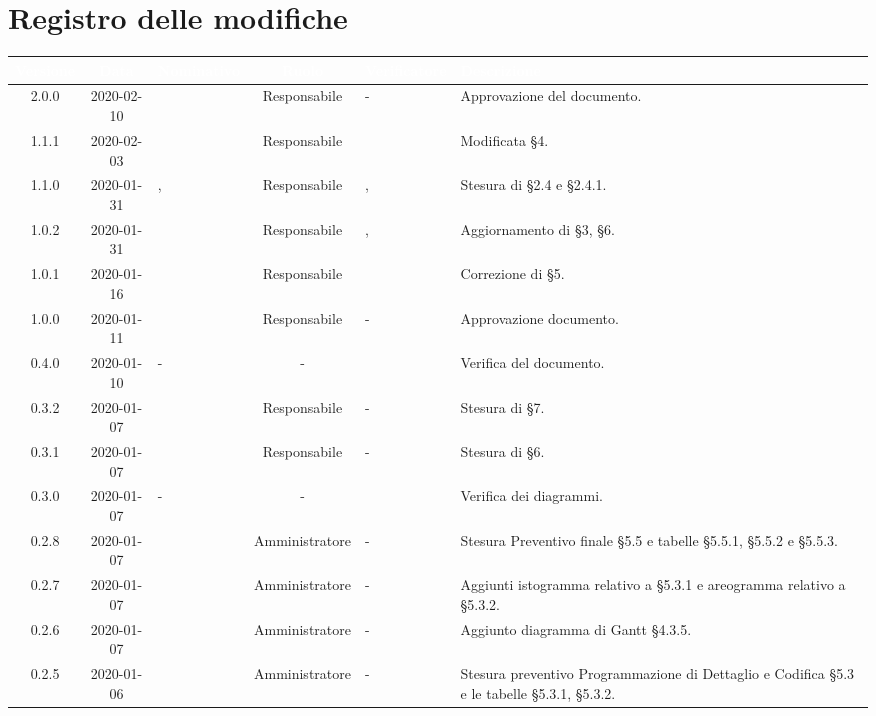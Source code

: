\section*{Registro delle modifiche}
\setcounter{table}{-1}
{
\renewcommand{\arraystretch}{1.5}
\centering
\begin{longtable}{ c c  C{2.5cm} c C{2.5cm} C{3.5cm}}
\textcolor{white}{\textbf{Versione}} &
\textcolor{white}{\textbf{Data}}&
\textcolor{white}{\textbf{Nominativo}}&
\textcolor{white}{\textbf{Ruolo}}&
\textcolor{white}{\textbf{Verificatore}}&
\textcolor{white}{\textbf{Descrizione}}\\
\endhead


2.0.0 & 2020-02-10 & \MC{} & Responsabile & - & Approvazione del documento. \\
1.1.1 & 2020-02-03 & \MC{} & Responsabile & \PF{} & Modificata §4. \\
1.1.0 & 2020-01-31 & \MC{}, \AT{} & Responsabile & \PF{}, \newline \SE{} & Stesura di §2.4 e §2.4.1. \\
1.0.2 & 2020-01-31 & \AT{} & Responsabile & \PF{}, \newline \SE{} & Aggiornamento di §3, §6. \\
1.0.1 & 2020-01-16 & \SE{} & Responsabile & \PF{} & Correzione di §5. \\
1.0.0 & 2020-01-11 & \SE{} & Responsabile & - & Approvazione documento. \\
0.4.0 & 2020-01-10 & - & - & \AT{} & Verifica del documento. \\
0.3.2 & 2020-01-07 & \SE{} & Responsabile & - & Stesura di §7. \\
0.3.1 & 2020-01-07 & \SE{} & Responsabile & - & Stesura di §6. \\
0.3.0 & 2020-01-07 & - & - & \MC{} & Verifica dei diagrammi. \\
0.2.8 & 2020-01-07 & \LD{} & Amministratore & - & Stesura Preventivo finale §5.5 e tabelle §5.5.1, §5.5.2 e §5.5.3. \\
0.2.7 & 2020-01-07 & \LD{} & Amministratore & - & Aggiunti istogramma relativo a §5.3.1 e areogramma relativo a §5.3.2. \\
0.2.6 & 2020-01-07 & \LD{} & Amministratore & - & Aggiunto diagramma di Gantt §4.3.5. \\
0.2.5 & 2020-01-06 & \LD{} & Amministratore & - & Stesura preventivo Programmazione di Dettaglio e Codifica §5.3 e le tabelle §5.3.1, §5.3.2. \\

\end{longtable}}
